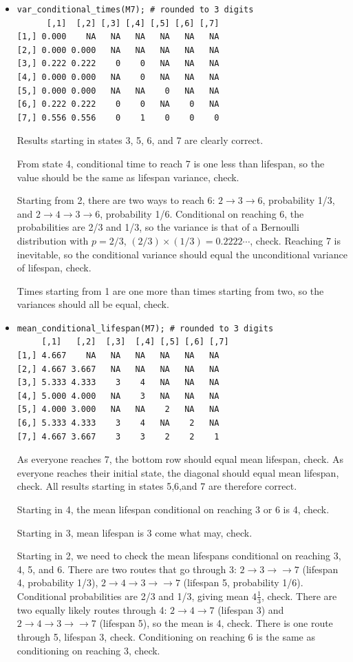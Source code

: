 \documentclass[12pt]{article}
\begin{document}
\begin{itemize}
From stage 1: should be conditional time from stage 2 plus 1, check. 

\item 
\begin{verbatim} 
var_conditional_times(M7); # rounded to 3 digits 
      [,1]  [,2] [,3] [,4] [,5] [,6] [,7]
[1,] 0.000    NA   NA   NA   NA   NA   NA
[2,] 0.000 0.000   NA   NA   NA   NA   NA
[3,] 0.222 0.222    0    0   NA   NA   NA
[4,] 0.000 0.000   NA    0   NA   NA   NA
[5,] 0.000 0.000   NA   NA    0   NA   NA
[6,] 0.222 0.222    0    0   NA    0   NA
[7,] 0.556 0.556    0    1    0    0    0
\end{verbatim} 
Results starting in states 3, 5, 6, and 7 are clearly correct. 

From state 4, conditional time to reach 7 is
one less than lifespan, so the value should be the same as lifespan variance, check. 

Starting from 2, there are two ways to reach 6: $2 \to 3 \to 6$, probability 1/3, and $2 \to 4 \to 3 \to 6$, probability 1/6. 
Conditional on reaching 6, the probabilities are 2/3 and 1/3, so the variance is that of a Bernoulli distribution
with $p=2/3$, $(2/3)\times (1/3) = 0.2222 \cdots$, check. Reaching 7 is inevitable, so the conditional variance
should equal the unconditional variance of lifespan, check. 

Times starting from 1 are one more than times starting from two, so the variances should all be equal, check. 

\item 
\begin{verbatim} 
mean_conditional_lifespan(M7); # rounded to 3 digits 
     [,1]   [,2]  [,3]  [,4] [,5] [,6] [,7]
[1,] 4.667    NA   NA   NA   NA   NA   NA
[2,] 4.667 3.667   NA   NA   NA   NA   NA
[3,] 5.333 4.333    3    4   NA   NA   NA
[4,] 5.000 4.000   NA    3   NA   NA   NA
[5,] 4.000 3.000   NA   NA    2   NA   NA
[6,] 5.333 4.333    3    4   NA    2   NA
[7,] 4.667 3.667    3    3    2    2    1
\end{verbatim} 
As everyone reaches 7, the bottom row should equal mean lifespan, check. 
As everyone reaches their initial state, the diagonal should equal mean lifespan, check. 
All results starting in states 5,6,and 7 are therefore correct. 

Starting in 4, the mean lifespan conditional on reaching 3 or 6 is 4, check. 

Starting in 3, mean lifespan is 3 come what may, check. 

Starting in 2, we need to check the mean lifespans conditional on reaching 3, 4, 5, and 6. 
There are two routes that go through 3: $2 \to 3 \to \to 7$ (lifespan 4, probability 1/3), 
$2 \to 4 \to 3 \to \to 7$ (lifespan 5, probability 1/6). Conditional probabilities are 2/3 and 1/3,
giving mean $4\frac{1}{3}$, check. 
There are two equally likely routes through 4: $2 \to 4 \to 7$ (lifespan 3) and $2 \to 4 \to 3 \to \to 7$ 
(lifespan 5), so the mean is 4, check. There is one route through 5, lifespan 3, check. Conditioning on 
reaching 6 is the same as conditioning on reaching 3, check. 


\end{itemize}
\end{document}
